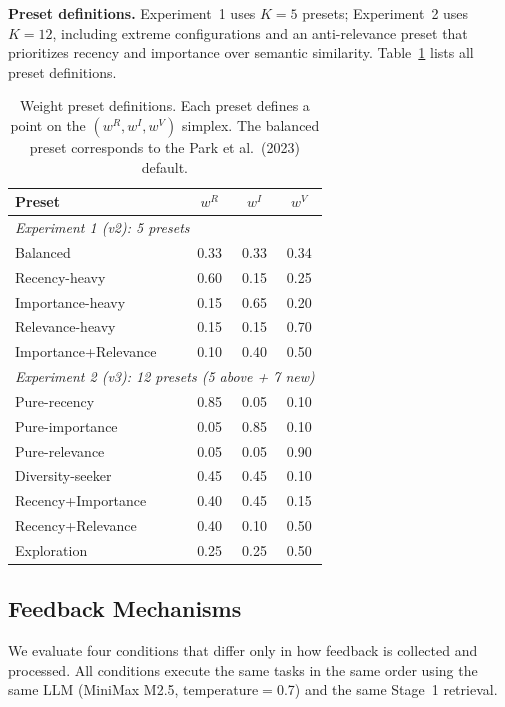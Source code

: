 \textbf{Preset definitions.}
Experiment~1 uses $K=5$ presets; Experiment~2 uses $K=12$, including extreme configurations and an anti-relevance preset that prioritizes recency and importance over semantic similarity.
Table~\ref{tab:presets} lists all preset definitions.

\begin{table}[t]
\centering
\small
\begin{tabular}{lccc}
\toprule
\textbf{Preset} & $w^R$ & $w^I$ & $w^V$ \\
\midrule
\multicolumn{4}{l}{\emph{Experiment 1 (v2): 5 presets}} \\
Balanced & 0.33 & 0.33 & 0.34 \\
Recency-heavy & 0.60 & 0.15 & 0.25 \\
Importance-heavy & 0.15 & 0.65 & 0.20 \\
Relevance-heavy & 0.15 & 0.15 & 0.70 \\
Importance+Relevance & 0.10 & 0.40 & 0.50 \\
\midrule
\multicolumn{4}{l}{\emph{Experiment 2 (v3): 12 presets (5 above + 7 new)}} \\
Pure-recency & 0.85 & 0.05 & 0.10 \\
Pure-importance & 0.05 & 0.85 & 0.10 \\
Pure-relevance & 0.05 & 0.05 & 0.90 \\
Diversity-seeker & 0.45 & 0.45 & 0.10 \\
Recency+Importance & 0.40 & 0.45 & 0.15 \\
Recency+Relevance & 0.40 & 0.10 & 0.50 \\
Exploration & 0.25 & 0.25 & 0.50 \\
\bottomrule
\end{tabular}
\caption{Weight preset definitions. Each preset defines a point on the $(w^R, w^I, w^V)$ simplex. The balanced preset corresponds to the Park et al.\ (2023) default.}
\label{tab:presets}
\end{table}

\subsection{Feedback Mechanisms}
\label{sec:feedback}

We evaluate four conditions that differ only in how feedback is collected and processed.
All conditions execute the same tasks in the same order using the same LLM (MiniMax M2.5, temperature${=}$0.7) and the same Stage~1 retrieval.

